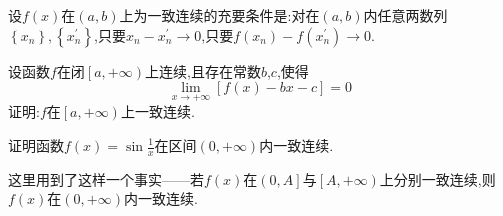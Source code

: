 \vspace{8cm}

\begin{example}
	设$f\left( x \right) $在$\left( a ,b \right) $上为一致连续的充要条件是:对在$\left( a ,b \right) $内任意两数列$\left\{ x_n \right\} ,\left\{ x_{n}^{'} \right\} $,只要$x_n-x_{n}^{'}\rightarrow 0$,只要$f\left( x_n \right) -f\left( x_{n}^{'} \right) \rightarrow 0$.
\end{example}

\vspace{8cm}

\begin{example}
	设函数$f$在闭$\left[ a,+\left. \infty \right) \right. $上连续,且存在常数$b$,$c$,使得
	$$
		\lim_{x\rightarrow +\infty}\left[ f\left( x \right) -bx-c \right] =0
	$$
	证明:$f$在$\left[ a,+\left. \infty \right) \right. $上一致连续.
\end{example}

\vspace{8cm}

\begin{example}
	证明函数$f\left( x \right) =\sin \frac{1}{x}$在区间$\left( 0 ,+\infty \right) $内一致连续.
\end{example}

\begin{note}
	这里用到了这样一个事实——若$f\left( x \right) $在$\left( \left. 0,A \right] \right. $与$\left[ \left. A,+\infty \right) \right. $上分别一致连续,则$f\left( x \right) $在$\left( 0 ,+\infty \right) $内一致连续.
	\vspace{6cm}
\end{note}

\newpage
